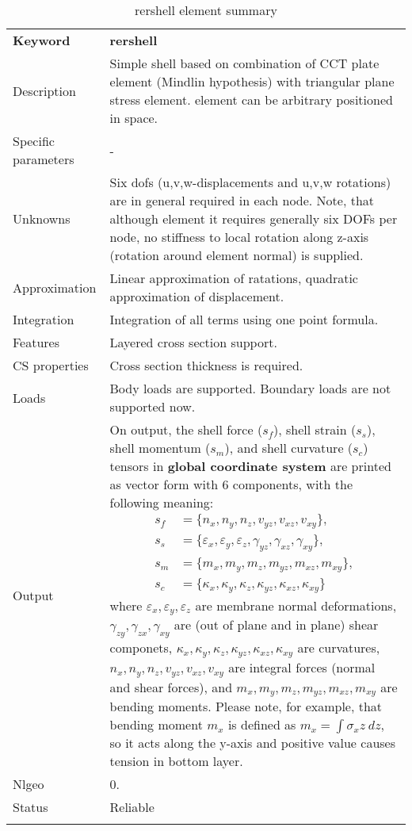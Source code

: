 \documentclass[a4paper]{article}
\newcommand{\param}[1]{\texttt{#1}} %
\newcommand{\templabel}{}%
\newcommand{\tempcaption}{}%
\newcounter{nelpar}
\newenvironment{elementsummary}[5]{%
  \gdef\tempcaption{#4}%
  \gdef\templabel{#5}%
  \setcounter{nelpar}{0}%
  \begin{center} %
    \begin{table}[!htb] %
      \begin{tabular}{|l|p{9cm}|}\hline %
        {\bf Keyword} & \bf{#1}\\ %
        {Description} & {#2}\\ %
        {Specific parameters} & {#3}\\ \hline %
}{
  \\ \hline %
      \end{tabular}%
      \caption{\tempcaption}%
      \label{\templabel}%
    \end{table}%
  \end{center}%
}
\newcommand{\elementParam}[1]{%
  \ifthenelse{\value{nelpar}>0} %
             {&{#1}}%
             {\setcounter{nelpar}{1}Parameters&{#1}}%
             \\%
}
\newcommand{\elementDescription}[2]{{#1} & {#2}\\ }
\begin{document}
\begin{elementsummary}{rershell}{Simple shell based on combination of CCT plate element (Mindlin hypothesis) with triangular plane stress element. element can be arbitrary positioned in space.}{-}{rershell element summary}{rershellsummary}
\elementDescription{Unknowns}{Six dofs (u,v,w-displacements and u,v,w rotations) are in general required in each node. Note, that although element it requires generally six DOFs per node, no stiffness to local rotation along z-axis (rotation around element normal) is supplied.}
\elementDescription{Approximation}{Linear approximation of ratations, quadratic approximation of displacement.}
\elementDescription{Integration}{Integration of all terms using one point formula.}
\elementDescription{Features}{Layered cross section support.}
\elementDescription{CS properties}{Cross section thickness is required.}
\elementDescription{Loads}{Body loads are supported. Boundary loads are not supported now.}
\elementDescription{Output}{On output, the shell force ($s_f$), shell strain ($s_s$), shell momentum ($s_m$), and shell curvature ($s_c$) tensors in \textbf{global coordinate system} are printed as vector form with 6 components, with the following meaning:
\begin{align*}
s_f &= \{n_x, n_y, n_z, v_{yz}, v_{xz}, v_{xy}\},\\
s_s &= \{\varepsilon_x, \varepsilon_y, \varepsilon_z, \gamma_{yz}, \gamma_{xz}, \gamma_{xy}\},\\
s_m &= \{m_x, m_y, m_z, m_{yz}, m_{xz}, m_{xy}\},\\
s_c &= \{\kappa_x, \kappa_y, \kappa_z, \kappa_{yz}, \kappa_{xz}, \kappa_{xy}\}
\end{align*}
where $\varepsilon_x, \varepsilon_y, \varepsilon_z$ are membrane normal deformations, $\gamma_{zy}, \gamma_{zx}, \gamma_{xy}$ are (out of plane and in plane) shear componets, $\kappa_x, \kappa_y, \kappa_z, \kappa_{yz}, \kappa_{xz}, \kappa_{xy}$ are curvatures, $n_x, n_y, n_z, v_{yz}, v_{xz}, v_{xy}$ are integral forces (normal and shear forces), and $m_x, m_y, m_z, m_{yz}, m_{xz}, m_{xy}$ are bending moments. 
Please note, for example, that bending moment $m_x$ is defined as $m_x=\int \sigma_x z\ dz$, so it acts along the y-axis and positive value causes tension in bottom layer.}
\elementDescription{Nlgeo}{0.}
\elementDescription{Status}{Reliable}
\end{elementsummary}
\end{document}
